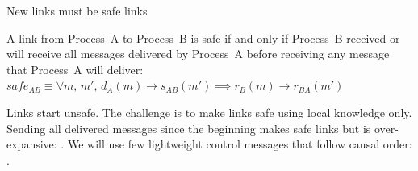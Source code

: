 \documentclass[10pt, xcolor={usenames, dvipsnames}]{beamer}
\newcommand{\cmark}{\ding{51}}
\newcommand{\xmark}{\ding{55}}
\newcommand{\YES}[1]{\textcolor{green}{#1}}
\newcommand{\NO}[1]{\textcolor{red}{#1}}
\begin{document}
\begin{frame}{New links must be safe links}

  \begin{definition}
    A link from Process~A to Process~B is safe if and only if Process~B received
    or will receive all messages delivered by Process~A before receiving any
    message that Process~A will deliver:
    $safe_{AB} \equiv \forall m,\, m',\, d_A(m) \rightarrow s_{AB}(m') \implies
    r_B(m) \rightarrow r_{BA}(m')$
  \end{definition}


    \begin{center}
      
    \end{center}


  Links start unsafe. The challenge is to make links safe using local knowledge
  only. Sending all delivered messages since the beginning makes safe links but
  is over-expansive: \NO{\xmark}. We will use few lightweight control messages
  that follow causal order: \YES{\cmark}.

\end{frame}
\end{document}
